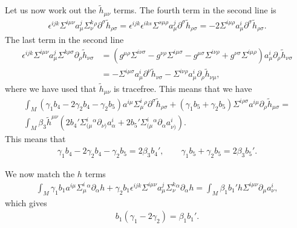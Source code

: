 \documentclass[10pt]{report}
\theoremstyle{definition}
\begin{document}
Let us now work out the $\tilde{h}_{\mu\nu}$ terms. The fourth term in the second line is
\begin{align}
\epsilon^{ijk} \Sigma^{i\mu\nu} a^j_\mu \Sigma^k_\nu{}^\rho \partial^\sigma \tilde{h}_{\rho\sigma}=\epsilon^{ijk}  \epsilon^{iks} \Sigma^{s\mu\rho} a^j_\mu\partial^\sigma \tilde{h}_{\rho\sigma}= - 2 \Sigma^{i\mu\rho} a^i_\mu\partial^\sigma \tilde{h}_{\rho\sigma}.
\end{align}
The last term in the second line
\begin{align}
\epsilon^{ijk} \Sigma^{i\mu\nu} a^j_\mu\Sigma^{k\rho\sigma}  \partial_\rho \tilde{h}_{\nu\sigma} & = ( g^{\mu\rho} \Sigma^{i\nu\sigma} - g^{\nu\rho} \Sigma^{i\mu\sigma} - g^{\mu\sigma} \Sigma^{i\nu\rho} + g^{\nu\sigma} \Sigma^{i\mu\rho}) a^i_\mu \partial_\rho \tilde{h}_{\nu\sigma} \\ \nonumber & = 
-\Sigma^{i\mu\sigma}  a^i_\mu \partial^\nu \tilde{h}_{\nu\sigma} - \Sigma^{i\nu\rho} a^i_\mu \partial_\rho \tilde{h}_{\nu\mu},
\end{align}
where we have used that $\tilde{h}_{\mu\nu}$ is tracefree. This means that we have
\begin{align}
\int_M (\gamma_1 b_4 - 2  \gamma_2 b_4-\gamma_2 b_5 ) a^{i\mu} \Sigma^i_\mu{}^\rho \partial^\sigma \tilde{h}_{\rho\sigma} + (\gamma_1 b_5 + \gamma_2 b_5) \Sigma^{i\rho\sigma} a^{i\mu} \partial_\rho \tilde{h}_{\mu\sigma}  = \\ \nonumber
\int_M \beta_3 \tilde{h}^{\mu\nu} (2b_4' \Sigma^i_{(\mu}{}^\alpha \partial_{\nu)}a_\alpha^i +  2b_5' \Sigma^i_{(\mu}{}^\alpha \partial_\alpha a_{\nu)}^i).
\end{align}
This means that
\begin{align}\label{b-prime-2}
\gamma_1 b_4 - 2  \gamma_2 b_4-\gamma_2 b_5  = 2\beta_3 b_4', \qquad \gamma_1 b_5 + \gamma_2 b_5 = 2 \beta_3 b_5'.
\end{align}

We now match the $h$ terms
\begin{align}\nonumber
\int_M \gamma_1 b_1 a^{i\mu}  \Sigma^i_\mu{}^\alpha \partial_\alpha h    
+ \gamma_2 b_1 \epsilon^{ijk} \Sigma^{i\mu\nu} a^j_\mu \Sigma^k_\nu{}^\alpha \partial_\alpha h  = 
\int_M \beta_1 b_1' h \Sigma^{i\mu\nu} \partial_\mu a_\nu^i ,
\end{align}
which gives 
\begin{align}\label{b-prime-3}
b_1 (\gamma_1  - 2\gamma_2 ) = \beta_1 b_1' .
\end{align}
\end{document}
